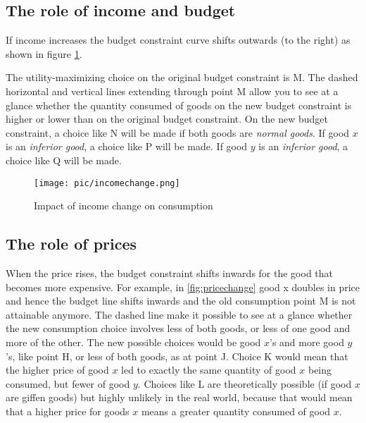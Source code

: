 

\subsection{The role of income and budget}\label{the-role-of-income-and-budget}

If income increases the budget constraint curve shifts outwards (to the right) as shown in figure \ref{fig:incomechange}.



The utility-maximizing choice on the original budget constraint is M. The dashed horizontal and vertical lines extending through point M allow you to see at a glance whether the quantity consumed of goods on the new budget constraint is higher or lower than on the original budget constraint. On the new budget constraint, a choice like N will be made if both goods are \emph{normal goods}. If good \(x\) is an \emph{inferior good}, a choice like P will be made. If good \(y\) is an \emph{inferior good}, a choice like Q will be made.

\begin{figure}
	\centering
	\texttt{[image: pic/incomechange.png]}
	\caption{\label{fig:incomechange} Impact of income change on consumption}
\end{figure}

\subsection{The role of prices}\label{the-role-of-prices}
When the price rises, the budget constraint shifts inwards for the good that becomes more expensive. For example, in \autoref{fig:pricechange} good x doubles in price and hence the budget line shifts inwards and the old consumption point M is not attainable anymore. The dashed line make it possible to see at a glance whether the new consumption choice involves less of both goods, or less of one good and more of the other. The new possible choices would be good \(x\)'s and more good \(y\)'s, like point H, or less of both goods, as at point J. Choice K would mean that the higher price of good \(x\) led to exactly the same quantity of good \(x\) being consumed, but fewer of good \(y\). Choices like L are theoretically possible (if good \(x\) are giffen goods) but highly unlikely in the real world, because that would mean that a higher price for goods \(x\) means a greater quantity consumed of good \(x\).

